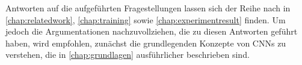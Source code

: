 Antworten auf die aufgeführten Fragestellungen lassen sich der Reihe nach in \autoref{chap:relatedwork}, \autoref{chap:training} sowie \autoref{chap:experimentresult} finden. Um jedoch die Argumentationen nachzuvollziehen, die zu diesen Antworten geführt haben, wird empfohlen, zunächst die grundlegenden Konzepte von CNNs zu verstehen, die in \autoref{chap:grundlagen} ausführlicher beschrieben sind.